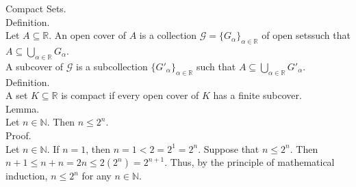 \documentclass[twocolumn]{article}
\newcommand{\naturals}{\mathbb{N}}
\newcommand{\reals}{\mathbb{R}}
\begin{document}
Compact Sets. \\

Definition. \\
Let $A \subseteq \reals$. An open cover of $A$ is a collection $\mathcal{G} = \{ G_\alpha \}_{\alpha \in \reals}$ of open setssuch that $A \subseteq \bigcup_{\alpha \in \reals} G_\alpha$. \\
A subcover of $\mathcal{G}$ is a subcollection $\{ G'_\alpha \}_{\alpha \in \reals}$ such that $A \subseteq \bigcup_{\alpha \in \reals} G'_\alpha$. \\

Definition. \\
A set $K \subseteq \reals$ is compact if every open cover of $K$ has a finite subcover. \\

Lemma. \\
Let $n \in \naturals$. Then $n \leq 2^n$. \\
Proof. \\
Let $n \in \naturals$. If $n = 1$, then $n = 1 < 2 = 2^1 = 2^n$. Suppose that $n \leq 2^n$. Then $n + 1 \leq n + n = 2n \leq 2(2^n) = 2^{n + 1}$. Thus, by the principle of mathematical induction, $n \leq 2^n$ for any $n \in \naturals$. \\
\end{document}
